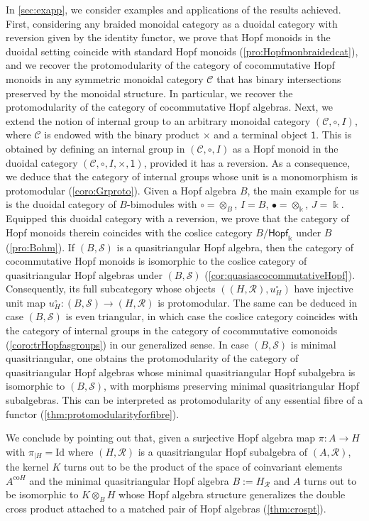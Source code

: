 \documentclass[nosumlimits,twoside]{amsart}
\theoremstyle{definition}
\theoremstyle{remark}
\newcommand{\id}{\mathrm{Id}}
\newcommand{\Cc}{\mathcal{C}}
\newcommand{\Rr}{\mathcal{R}}
\newcommand{\Ss}{\mathcal{S}}
\newcommand{\ot}{\otimes}
\begin{document}
In \cref{sec:exapp}, we consider examples and applications of the results achieved. First, considering any braided monoidal category as a duoidal category with reversion given by the identity functor, we prove that Hopf monoids in the duoidal setting coincide with standard Hopf monoids (\cref{pro:Hopfmonbraidedcat}), and we recover the protomodularity of the category of cocommutative Hopf monoids in any symmetric monoidal category $\Cc$ that has binary intersections preserved by the monoidal structure. In particular, we recover the protomodularity of the category of cocommutative Hopf algebras. Next, we extend the notion of internal group to an
arbitrary monoidal category $(\Cc,\circ,I)$, where $\Cc$ is endowed with the binary product $\times$ and a  terminal object $\mathsf{1}$. This is obtained by defining an internal group in $(\Cc,\circ,I)$ as a Hopf monoid in the duoidal category $(\Cc,\circ,I,\times,\mathsf{1})$, provided it has a reversion. As a consequence, we deduce that the category of internal groups whose unit is a monomorphism is protomodular (\cref{coro:Grproto}). 
Given a Hopf algebra $B$, the main example for us is the duoidal category of $B$-bimodules with $\circ=\ot_{B}$, $I=B$, $\bullet=\ot_{\Bbbk}$, $J=\Bbbk$. Equipped this duoidal category with a reversion, we prove that the category of Hopf monoids therein coincides with the coslice category $B/\mathsf{Hopf}_{\Bbbk}$ under $B$ (\cref{pro:Bohm}). If $(B,\Ss)$ is a quasitriangular Hopf algebra, then the category of cocommutative Hopf monoids is isomorphic to the coslice category of quasitriangular Hopf algebras under $(B,\Ss)$ (\cref{cor:quasiascocommutativeHopf}). 
Consequently, its full subcategory whose objects $((H,\Rr),u_{H}^{\circ})$ have injective  unit map $u_{H}^{\circ}:(B,\Ss)\to(H,\Rr)$ is protomodular. The same can be deduced in case $(B,\Ss)$ is even triangular, in which case the coslice category coincides with the category of internal groups in the category of cocommutative comonoids (\cref{coro:trHopfasgroups}) in our generalized sense. 
In case $(B,\Ss)$ is minimal quasitriangular, one obtains the protomodularity of the category of quasitriangular Hopf algebras whose minimal quasitriangular Hopf subalgebra is isomorphic to $(B,\Ss)$, with morphisms preserving minimal quasitriangular Hopf subalgebras. This can be interpreted as protomodularity of any essential fibre of a functor (\cref{thm:protomodularityforfibre}). 

We conclude by pointing out that, given a surjective Hopf algebra map $\pi:A\to H$ with $\pi_{\mid H}=\id$ where $(H,\Rr)$ is a quasitriangular Hopf subalgebra of $(A,\Rr)$, the kernel $K$ turns out to be the product of the space of coinvariant elements $A^{\mathrm{co}H}$ and the minimal quasitriangular Hopf algebra $B:=H_{\Rr}$ and $A$ turns out to be isomorphic to $K\ot_{B}H$ whose Hopf algebra structure generalizes the double cross product attached to a matched pair of Hopf algebras (\cref{thm:crospt}).
\end{document}
